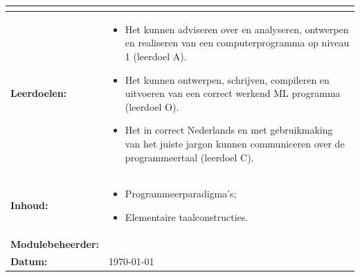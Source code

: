 \begin{tabularx}{\textwidth}{|>{\columncolor{lichtGrijs}} p{}|X|}
\begin{center}
	\end{center}\\
	\hline
	\textbf{Leerdoelen:}&
	\begin{itemize}
		\item Het kunnen adviseren over en analyseren, ontwerpen en realiseren van een computerprogramma op niveau 1 (leerdoel A).
		\item Het kunnen ontwerpen, schrijven, compileren en uitvoeren van een correct werkend ML programma (leerdoel O).
		\item Het in correct Nederlands en met gebruikmaking van het juiste jargon kunnen communiceren over de programmeertaal (leerdoel C).
	\end{itemize} \\
	\hline
	\textbf{Inhoud:}&
	\begin{itemize}
		\item Programmeerparadigma's;
		\item Elementaire taalconstructies.
	\end{itemize}\\
	\hline
	\textbf{Modulebeheerder:} & \author\\
	\hline
	\textbf{Datum:} & \today \\
	\hline
\end{tabularx}
\newpage
